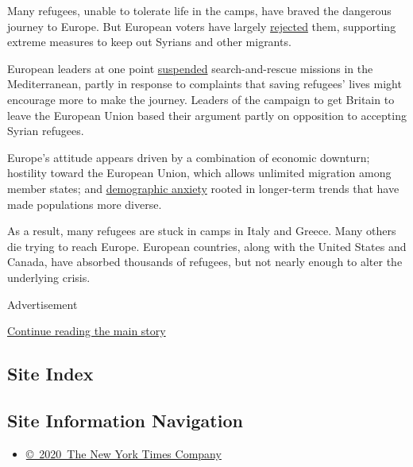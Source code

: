 Many refugees, unable to tolerate life in the camps, have braved the
dangerous journey to Europe. But European voters have largely
\href{https://www.theguardian.com/world/2016/sep/01/alan-kurdi-death-one-year-on-compassion-towards-refugees-fades?CMP=share_btn_tw}{rejected}
them, supporting extreme measures to keep out Syrians and other
migrants.

European leaders at one point
\href{http://www.nytimes3xbfgragh.onion/2015/04/25/world/europe/europes-migration-crisis-cannot-be-solved-at-sea-analysts-say.html}{suspended}
search-and-rescue missions in the Mediterranean, partly in response to
complaints that saving refugees' lives might encourage more to make the
journey. Leaders of the campaign to get Britain to leave the European
Union based their argument partly on opposition to accepting Syrian
refugees.

Europe's attitude appears driven by a combination of economic downturn;
hostility toward the European Union, which allows unlimited migration
among member states; and
\href{http://www.nytimes3xbfgragh.onion/2016/08/19/world/europe/frances-burkini-bans-are-about-more-than-religion-or-clothing.html?rref=collection\%2Fcolumn\%2Fthe-interpreter\&action=click\&contentCollection=world\&region=stream\&module=stream_unit\&version=latest\&contentPlacement=8\&pgtype=collection}{demographic
anxiety} rooted in longer-term trends that have made populations more
diverse.

As a result, many refugees are stuck in camps in Italy and Greece. Many
others die trying to reach Europe. European countries, along with the
United States and Canada, have absorbed thousands of refugees, but not
nearly enough to alter the underlying crisis.

Advertisement

\protect\hyperlink{after-bottom}{Continue reading the main story}

\hypertarget{site-index}{%
\subsection{Site Index}\label{site-index}}

\hypertarget{site-information-navigation}{%
\subsection{Site Information
Navigation}\label{site-information-navigation}}

\begin{itemize}
\tightlist
\item
  \href{https://help.nytimes3xbfgragh.onion/hc/en-us/articles/115014792127-Copyright-notice}{©~2020~The
  New York Times Company}
\end{itemize}

